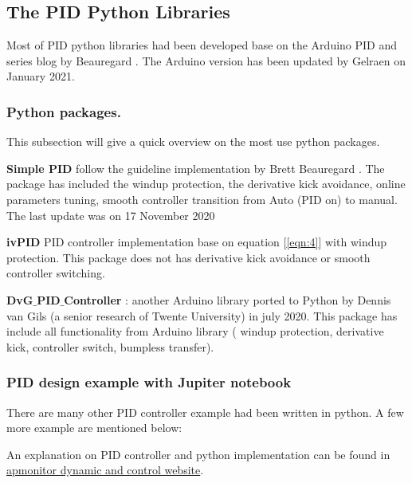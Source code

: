 \subsection{The PID Python Libraries}

Most of PID python libraries had been developed base on the Arduino PID and series blog by Beauregard \cite{Arduino_PID}  \cite{Improving_PID}. The Arduino version has been updated by 
Gelraen \cite{Arduino_PID_V2} on January 2021.

\subsubsection{Python packages.}
This subsection will give a quick overview on the most use python packages.

\textbf{Simple PID} \cite{Simple_Pid} follow the guideline implementation by Brett Beauregard  \cite{Improving_PID}. The package has included the windup protection, the derivative kick avoidance, online parameters tuning, smooth controller transition from Auto (PID on) to manual. The last update was on 17 November 2020

\textbf{ivPID} \cite{ivPID} PID controller implementation base on equation [\ref{eqn:4}] with windup protection. This package does not has derivative kick avoidance or smooth controller switching.

\textbf{DvG${\_}$PID${\_}$Controller} \cite{DvG_PID_Controller}: another Arduino library \cite{Arduino_PID} ported to Python by Dennis van Gils (a senior research of Twente University) in july 2020. This package has include all functionality from Arduino library ( windup protection, derivative kick, controller switch, bumpless transfer).

\subsubsection{PID design example with Jupiter notebook}

There are many other PID controller example had been written in python. A few more example are mentioned below:

An explanation on PID controller and python implementation can be found in \href{https://apmonitor.com/pdc/index.php/Main/ProportionalIntegralDerivative}{apmonitor dynamic and control website}.

